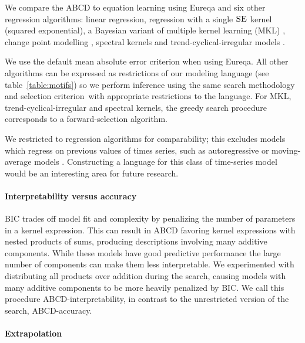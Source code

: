 \documentclass[letterpaper]{article}
\newcommand{\procedurename}{ABCD}
\begin{document}
We compare the \procedurename{} to equation learning using Eureqa \citep{Eureqa} and six other regression algorithms: linear regression, \gp{} regression with a single ${\textsc{SE}}$ kernel (squared exponential), a Bayesian variant of multiple kernel learning (MKL) \citep{bach2004multiple}, change point modelling
\citep{garnett2010sequential, FoxDunson:NIPS2012}, spectral kernels \citep{WilAda13} and trend-cyclical-irregular models \citep[e.g.][]{lind2006basic}.

We use the default mean absolute error criterion when using Eureqa.
All other algorithms can be expressed as restrictions of our modeling language (see table~\ref{table:motifs}) so we perform inference using the same search methodology and selection criterion\footnotemark~with appropriate restrictions to the language.
For MKL, trend-cyclical-irregular and spectral kernels, the greedy search procedure corresponds to a forward-selection algorithm. 

We restricted to regression algorithms for comparability; this excludes models which regress on previous values of times series, such as autoregressive or moving-average models \citep[e.g.][]{box2013time}.
Constructing a language for this class of time-series model would be an interesting area for future research.

\paragraph{Interpretability versus accuracy}

BIC trades off model fit and complexity by penalizing the number of parameters in a kernel expression.
This can result in \procedurename{} favoring kernel expressions with nested products of sums, producing descriptions involving many additive components.
While these models have good predictive performance the large number of components can make them less interpretable.
We experimented with distributing all products over addition during the search, causing models with many additive components to be more heavily penalized by BIC.
We call this procedure \procedurename{}-interpretability, in contrast to the unrestricted version of the search, \procedurename{}-accuracy.

\paragraph{Extrapolation}
\end{document}
